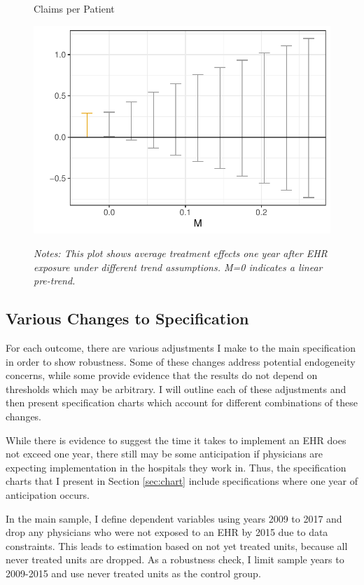 \documentclass[12pt]{article}
\begin{document}
\begin{figure}[ht]
    \centering
    \captionsetup{width=.5\linewidth}
    \caption{Claims per Patient}
    \includegraphics[scale=.5]{Objects/claim_pretrends_plot.pdf}
    \label{fig:pre_claim}
    \vspace{2mm}
    \caption*{\footnotesize{\textit{Notes: This plot shows average treatment effects one year after EHR exposure under different trend assumptions. M=0 indicates a linear pre-trend.}}}
\end{figure}

\subsection{Various Changes to Specification}\label{sec:changes}

For each outcome, there are various adjustments I make to the main specification in order to show robustness. Some of these changes address potential endogeneity concerns, while some provide evidence that the results do not depend on thresholds which may be arbitrary. I will outline each of these adjustments and then present specification charts which account for different combinations of these changes. 

While there is evidence to suggest the time it takes to implement an EHR does not exceed one year, there still may be some anticipation if physicians are expecting implementation in the hospitals they work in. Thus, the specification charts that I present in Section \ref{sec:chart} include specifications where one year of anticipation occurs. 

In the main sample, I define dependent variables using years 2009 to 2017 and drop any physicians who were not exposed to an EHR by 2015 due to data constraints. This leads to estimation based on not yet treated units, because all never treated units are dropped. As a robustness check, I limit sample years to 2009-2015 and use never treated units as the control group. 
\end{document}
